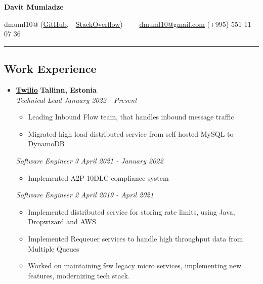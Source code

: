\documentclass[10pt,letterpaper]{article}
\begin{document}
\begin{center}
{\huge \textbf{Davit Mumladze}}


dmuml10@ (\href{https://github.com/dmuml10/}{GitHub},\ \
 \href{https://stackoverflow.com/users/2210779/davit-mumladze}{StackOverflow})\ \
\textbullet
\ \ \href{mailto:dmuml10@gmail.com}{dmuml10@gmail.com} (+995) 551 11 07 36

\end{center}


\hrule
\vspace{-1.0em}
\subsection*{Work Experience}
  \begin{itemize}
    \parskip=-0.5em
    
         \item[]
    {\href{https://www.twilio.com/}{\textbf{Twilio}} \hfill
      \textbf{Tallinn, Estonia}}
    \\
    {\emph{Technical Lead} \hfill \emph{January 2022 - Present}}
    \begin{itemize}[label=\textbullet]
      \itemsep0em
      \item Leading Inbound Flow team, that handles inbound message traffic
      \item Migrated high load distributed service from self hosted MySQL to DynamoDB
    \end{itemize}
    \hfill \break
    
    {\emph{Software Engineer 3} \hfill \emph{April 2021 - January 2022}}
    
    \begin{itemize}[label=\textbullet]
      \itemsep0em
      \item Implemented A2P 10DLC compliance system
    \end{itemize}
    \hfill \break
    
    {\emph{Software Engineer 2} \hfill \emph{April 2019 - April 2021}}

    \begin{itemize}[label=\textbullet]
      \itemsep0em
      \item Implemented distributed service for storing rate limits, using Java, Dropwizard and AWS
      \item Implemented Requeuer services to handle high throughput data from Multiple Queues
      \item Worked on maintaining few legacy micro services, implementing new features, modernizing tech stack.
    \end{itemize}
    \hfill \break
    

\end{itemize}
\end{document}
